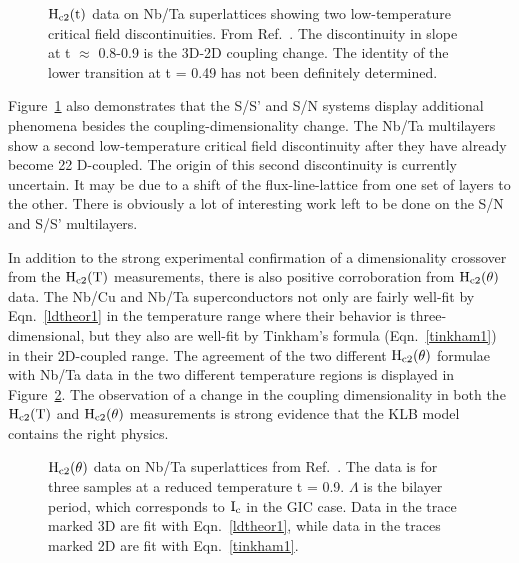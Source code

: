\begin{figure}
\vspace{12cm}
\caption[$\rm H_{c2}(T)$ data on Nb/Ta superlattices showing 2
low-temperature transitions.]{$\rm  H_{c2}(t)$ data on Nb/Ta  superlattices
showing   two   low-temperature    critical    field discontinuities.    From
Ref.~\cite{broussard87}.  The discontinuity in slope at t $\approx$ 0.8-0.9
is the 3D-2D coupling change.  The identity of the lower transition at  t = 0.49 has
not been definitely determined.}
\label{assltemp}
\end{figure}

        Figure~\ref{assltemp} also  demonstrates  that  the  S/S'  and  S/N
systems display   additional phenomena  besides  the coupling-dimensionality
change.  The Nb/Ta multilayers show a second low-temperature critical field
discontinuity after they  have already become 22  D-coupled.   The origin
of this second discontinuity  is currently uncertain.   It may be  due to a
shift   of  the   flux-line-lattice   from   one   set  of  layers  to  the
other.\cite{takahashi86c,broussard87b}   There    is  obviously  a  lot  of
interesting work left to be done on the S/N and S/S' multilayers.

	In  addition  to   the  strong experimental     confirmation  of  a
dimensionality crossover from the  $\rm  H_{c2}(T)$  measurements, there is
also positive corroboration from $\rm  H_{c2}(\theta)$ data.  The Nb/Cu and
Nb/Ta superconductors not  only  are fairly well-fit by Eqn.~\ref{ldtheor1}
in  the temperature range where their  behavior is   three-dimensional, but
they also are well-fit by  Tinkham's formula (Eqn.~\ref{tinkham1}) in their
2D-coupled   range.\cite{chun84,broussard87}  The  agreement   of  the  two
different  $\rm H_{c2}(\theta)$   formulae  with Nb/Ta  data   in  the  two
different temperature regions is displayed in  Figure~\ref{assltheta}.  The
observation  of a change in  the coupling dimensionality  in  both the $\rm
H_{c2}(T)$  and $\rm H_{c2}(\theta)$  measurements is strong  evidence that
the KLB model contains the right physics.

\begin{figure}
\vspace{15cm}
\caption[$\rm H_{c2}(\theta)$ data on Nb/Ta superlattices.]{$\rm H_{c2}(\theta)$ data on Nb/Ta superlattices from 
Ref.~\cite{broussard88}.  The data is for three  samples at a
reduced temperature t  =  0.9.   $\Lambda$  is  the  bilayer  period, which
corresponds to $\rm I_c$ in the GIC case.  Data in  the trace marked 3D are
fit with Eqn.~\ref{ldtheor1}, while data in the  traces  marked  2D are fit
with Eqn.~\ref{tinkham1}.}
\label{assltheta}
\end{figure}

